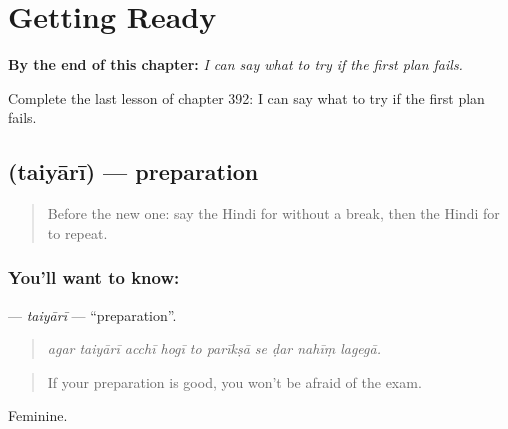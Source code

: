 
\chapter{Getting Ready}
\label{ch:hi-getting-ready}

\begin{chapteropening}
\textbf{By the end of this chapter:} \emph{I can say what to try if the first plan fails.}

Complete the last lesson of chapter 392: I can say what to try if the first plan fails.
\end{chapteropening}

\section[\texorpdfstring{\hi{तैयारी} (taiyārī)}{तैयारी (taiyārī)}]{ (taiyārī) — preparation}

\label{lesson:HI-C392-taiyari}



\begin{quote}
Before the new one: say the Hindi for without a break, then the Hindi for to repeat.
\end{quote}

\subsection*{You'll want to know: }
\textbf{} — \emph{taiyārī} — \textquotedblleft{}preparation\textquotedblright{}.

\begin{quote}
         
\end{quote}

\begin{quote}
\emph{agar taiyārī acchī hogī to parīkṣā se ḍar nahīṃ lagegā.}
\end{quote}

\begin{quote}
If your preparation is good, you won't be afraid of the exam.
\end{quote}

Feminine.


